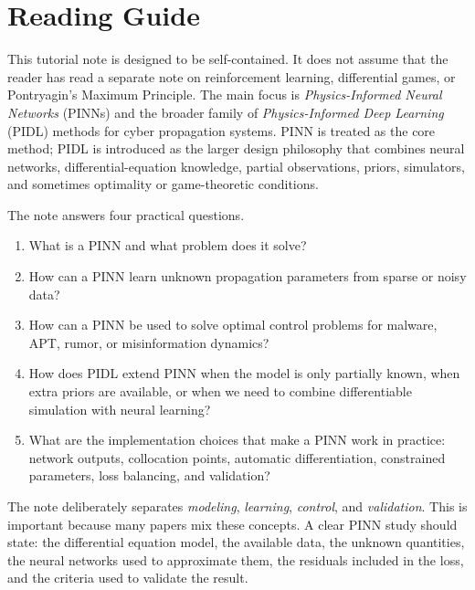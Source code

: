 \documentclass[11pt,a4paper]{article}
\begin{document}
\tableofcontents
\newpage
\section*{Reading Guide}
This tutorial note is designed to be self-contained. It does not assume that the reader has read a separate note on reinforcement learning, differential games, or Pontryagin's Maximum Principle. The main focus is \emph{Physics-Informed Neural Networks} (PINNs) and the broader family of \emph{Physics-Informed Deep Learning} (PIDL) methods for cyber propagation systems. PINN is treated as the core method; PIDL is introduced as the larger design philosophy that combines neural networks, differential-equation knowledge, partial observations, priors, simulators, and sometimes optimality or game-theoretic conditions.

The note answers four practical questions.
\begin{enumerate}[leftmargin=2em]
    \item What is a PINN and what problem does it solve?
    \item How can a PINN learn unknown propagation parameters from sparse or noisy data?
    \item How can a PINN be used to solve optimal control problems for malware, APT, rumor, or misinformation dynamics?
    \item How does PIDL extend PINN when the model is only partially known, when extra priors are available, or when we need to combine differentiable simulation with neural learning?
    \item What are the implementation choices that make a PINN work in practice: network outputs, collocation points, automatic differentiation, constrained parameters, loss balancing, and validation?
\end{enumerate}

The note deliberately separates \emph{modeling}, \emph{learning}, \emph{control}, and \emph{validation}. This is important because many papers mix these concepts. A clear PINN study should state: the differential equation model, the available data, the unknown quantities, the neural networks used to approximate them, the residuals included in the loss, and the criteria used to validate the result.
\end{document}
